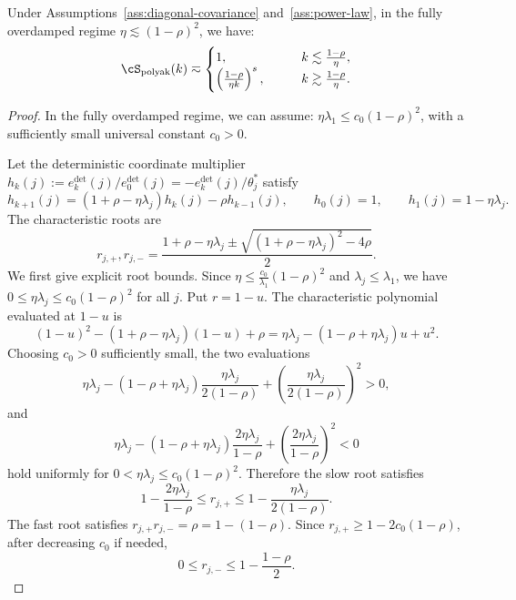\documentclass[11pt]{article}
\newcommand{\polyak}{\mathrm{polyak}}
\begin{document}
\begin{proposition}
\label{prop:pol_deterministic_bias0}
Under Assumptions~\ref{ass:diagonal-covariance} and~\ref{ass:power-law}, in the fully overdamped regime $\eta\lesssim (1-\rho)^2$, we have:
\begin{equation*}
    \cS_{\polyak}(k)
    \eqsim
    \begin{cases}
    1,&\qquad k\lesssim \frac{1-\rho}{\eta},\\
    \left(\frac{1-\rho}{\eta k}\right)^s, &\qquad k\gtrsim\frac{1-\rho}{\eta}.\\
    \end{cases}
\end{equation*}
\end{proposition}
\begin{proof}
In the fully overdamped regime, we can assume: $\eta\lambda_1\le c_0 (1-\rho)^2$, with a sufficiently small universal constant $c_0>0$.

Let the deterministic coordinate multiplier $h_k(j):=e_k^{\mathrm{det}}(j)/e_0^{\mathrm{det}}(j) = -e_k^{\mathrm{det}}(j)/\theta_j^*$ satisfy
\[
    h_{k+1}(j)=(1+\rho-\eta\lambda_j)h_k(j)-\rho h_{k-1}(j),
    \qquad
    h_0(j)=1,
    \qquad
    h_1(j)=1-\eta\lambda_j.
\]
The characteristic roots are
\[
    r_{j,+},r_{j,-}
    =
    \frac{1+\rho-\eta\lambda_j\pm\sqrt{(1+\rho-\eta\lambda_j)^2-4\rho}}{2}.
\]
We first give explicit root bounds. Since $\eta\le \frac{c_0}{\lambda_1}(1-\rho)^2$ and $\lambda_j\le\lambda_1$, we have $0\le \eta\lambda_j\le c_0(1-\rho)^2$ for all $j$. Put $r=1-u$. The characteristic polynomial evaluated at $1-u$ is
\[
    (1-u)^2-(1+\rho-\eta\lambda_j)(1-u)+\rho
    =
    \eta\lambda_j-(1-\rho+\eta\lambda_j)u+u^2.
\]
Choosing $c_0>0$ sufficiently small, the two evaluations
\[
    \eta\lambda_j-(1-\rho+\eta\lambda_j)\frac{\eta\lambda_j}{2(1-\rho)}+\left(\frac{\eta\lambda_j}{2(1-\rho)}\right)^2>0,
\]
and
\[
    \eta\lambda_j-(1-\rho+\eta\lambda_j)\frac{2\eta\lambda_j}{1-\rho}+\left(\frac{2\eta\lambda_j}{1-\rho}\right)^2<0
\]
hold uniformly for $0<\eta\lambda_j\le c_0(1-\rho)^2$. Therefore the slow root satisfies
\begin{equation}
\label{eq:pol_slow_root_bounds_sgd}
    1-\frac{2\eta\lambda_j}{1-\rho}
    \le
    r_{j,+}
    \le
    1-\frac{\eta\lambda_j}{2(1-\rho)}.
\end{equation}
The fast root satisfies $r_{j,+}r_{j,-}=\rho=1-(1-\rho)$. Since $r_{j,+}\ge1-2c_0(1-\rho)$, after decreasing $c_0$ if needed,
\begin{equation}
\label{eq:pol_fast_root_bound_sgd}
    0\le r_{j,-}\le 1-\frac{1-\rho}{2}.
\end{equation}


\end{proof}
\end{document}
